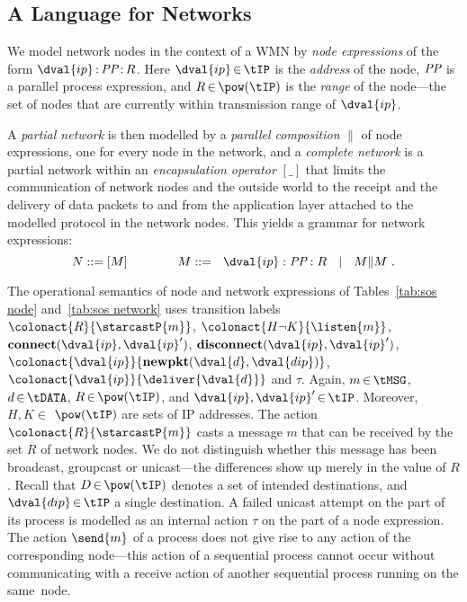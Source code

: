 \documentclass[envcountsame,envcountsect,orivec,runningheads]{llncs}
\newcommand{\PP}{\mbox{\it PP}}
\begin{document}
\subsection{A Language for Networks}
We model network nodes in the context of a WMN
by \emph{node expressions} of the form $\dval{ip}\mathop{:}\PP\mathop{:}R$. Here $\dval{ip}
\mathop\in \tIP$ is the \emph{address} of the node, $\PP$ is a parallel process
expression, and $R\mathop\in\pow(\tIP)$ is the \emph{range} of the node---the
set of nodes that are currently within transmission range of $\dval{ip}$.

A \emph{partial network} is then modelled by a \emph{parallel
composition} $\|$ of node expressions, one for every node in the
network, and a \emph{complete network} is a partial network within an
\emph{encapsulation operator} $[\_]$ that 
limits the communication of network nodes and the outside world to the receipt and the delivery of data packets to and from the application layer attached to the modelled protocol in the network nodes.
This yields a grammar for network
expressions:
\[N ::= [M] \qquad\qquad M::= ~~ \dval{ip}:\PP:R ~~\mid~~ M \| M\ .\]

The operational semantics of node and network expressions of
Tables~\ref{tab:sos node} and~\ref{tab:sos network} uses transition
labels
$\colonact{R}{\starcastP{m}}$,
$\colonact{H\neg K}{\listen{m}}$,
$\textbf{connect}(\dval{ip},\dval{ip}')$,
$\textbf{disconnect}(\dval{ip},\dval{ip}')$,
$\colonact{\dval{ip}}{\textbf{newpkt}(\dval{d},\dval{dip})}$,
$\colonact{\dval{ip}}{\deliver{\dval{d}}}$
and $\tau$.
Again, \mbox{$m\mathop{\in}\tMSG$}, $d\mathop{\in}\tDATA$, $R\mathop{\in}\pow(\tIP)$, and
$\dval{ip},\dval{ip}'\mathop{\in}\tIP$.  Moreover, $H,K \mathop{\in}$ $\pow(\tIP)$ are sets
of IP addresses.  The action $\colonact{R}{\starcastP{m}}$ casts a
message $m$ that can be received by the set $R$ of network nodes.  We
do not distinguish whether this message has been broadcast, groupcast
or unicast---the differences show up merely in the value of
$R$. Recall that $D\mathop\in\pow(\tIP)$ denotes a set of intended
destinations, and $\dval{dip}\mathop\in\tIP$ a single destination. A failed
unicast attempt on the part of its process is modelled as an internal
action $\tau$ on the part of a node expression.  The action $\send{m}$
of a process does not give rise to any action of the corresponding
node---this action of a sequential process cannot occur without
communicating with a receive action of another sequential process
running on the same~node.
\end{document}
